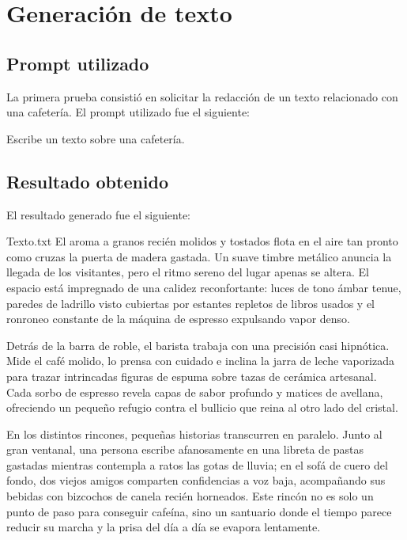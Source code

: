 \documentclass[12pt,a4paper]{article}
\begin{document}
\section{Generación de texto}

\subsection{Prompt utilizado}

La primera prueba consistió en solicitar la redacción de un texto relacionado con
una cafetería. El prompt utilizado fue el siguiente:

\begin{promptbox}
Escribe un texto sobre una cafetería.
\end{promptbox}

\subsection{Resultado obtenido}

El resultado generado fue el siguiente:

\begin{result}{Texto.txt}
El aroma a granos recién molidos y tostados flota en el aire tan pronto como
cruzas la puerta de madera gastada. Un suave timbre metálico anuncia la
llegada de los visitantes, pero el ritmo sereno del lugar apenas se altera. El
espacio está impregnado de una calidez reconfortante: luces de tono ámbar
tenue, paredes de ladrillo visto cubiertas por estantes repletos de libros usados
y el ronroneo constante de la máquina de espresso expulsando vapor denso.

Detrás de la barra de roble, el barista trabaja con una precisión casi hipnótica.
Mide el café molido, lo prensa con cuidado e inclina la jarra de leche
vaporizada para trazar intrincadas figuras de espuma sobre tazas de cerámica
artesanal. Cada sorbo de espresso revela capas de sabor profundo y matices
de avellana, ofreciendo un pequeño refugio contra el bullicio que reina al
otro lado del cristal.

En los distintos rincones, pequeñas historias transcurren en paralelo. Junto
al gran ventanal, una persona escribe afanosamente en una libreta de pastas
gastadas mientras contempla a ratos las gotas de lluvia; en el sofá de cuero
del fondo, dos viejos amigos comparten confidencias a voz baja, acompañando
sus bebidas con bizcochos de canela recién horneados. Este rincón no es solo
un punto de paso para conseguir cafeína, sino un santuario donde el tiempo
parece reducir su marcha y la prisa del día a día se evapora lentamente.
\end{result}
\end{document}
